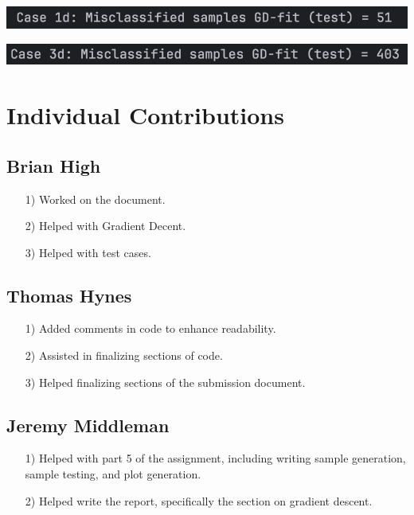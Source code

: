 \documentclass{article}
\begin{document}
\begin{center}
\includegraphics[scale=0.75]{../figs/T8.2.png} \\
\end{center}

\begin{center}
\includegraphics[scale=0.75]{../figs/T8.3.png} \\
\end{center}

\section{Individual Contributions}

\subsection{Brian High}
\begin{itemize}
    \item[1)] Worked on the document.
    \item[2)] Helped with Gradient Decent.
    \item[3)] Helped with test cases.
\end{itemize}

\subsection{Thomas Hynes}
\begin{itemize}
    \item[1)] Added comments in code to enhance readability.
    \item[2)] Assisted in finalizing  sections of code.
    \item[3)] Helped finalizing sections of the submission document.
\end{itemize}

\subsection{Jeremy Middleman}
\begin{itemize}
    \item[1)] Helped with part 5 of the assignment, including writing sample generation, sample testing, and plot generation.
    \item[2)] Helped write the report, specifically the section on gradient descent.
\end{itemize}
\end{document}

